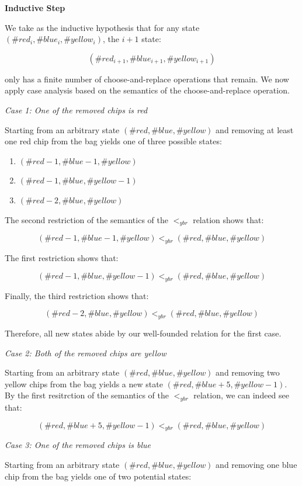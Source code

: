 \documentclass{article}
\begin{document}
\textbf{Inductive Step}

We take as the inductive hypothesis that for any state $(\#red_i, \#blue_i, \#yellow_i)$, the $i + 1$ state:

$$(\#red_{i + 1}, \#blue_{i + 1}, \#yellow_{i + 1})$$

only has a finite number of choose-and-replace operations that remain. We now apply case analysis based on the semantics of the choose-and-replace operation.

\emph{Case 1: One of the removed chips is red}

Starting from an arbitrary state $(\#red, \#blue, \#yellow)$ and removing at least one red chip from the bag yields one of three possible states:

\begin{enumerate}
  \item $(\#red - 1, \#blue - 1, \#yellow)$
  \item $(\#red - 1, \#blue, \#yellow - 1)$
  \item $(\#red - 2, \#blue, \#yellow)$
\end{enumerate}

The second restriction of the semantics of the $<_{ybr}$ relation shows that:

$$
(\#red - 1, \#blue - 1, \#yellow) <_{ybr} (\#red, \#blue, \#yellow)
$$

The first restriction shows that:

$$
(\#red - 1, \#blue, \#yellow - 1) <_{ybr} (\#red, \#blue, \#yellow)
$$

Finally, the third restriction shows that:

$$
(\#red - 2, \#blue, \#yellow) <_{ybr} (\#red, \#blue, \#yellow)
$$

Therefore, all new states abide by our well-founded relation for the first case.

\emph{Case 2: Both of the removed chips are yellow}

Starting from an arbitrary state $(\#red, \#blue, \#yellow)$ and removing two yellow chips from the bag yields a new state $(\#red, \#blue + 5, \#yellow - 1)$. By the first resitrction of the semantics of the $<_{ybr}$ relation, we can indeed see that:

$$
(\#red, \#blue + 5, \#yellow - 1) <_{ybr} (\#red, \#blue, \#yellow)
$$

\emph{Case 3: One of the removed chips is blue}

Starting from an arbitrary state $(\#red, \#blue, \#yellow)$ and removing one blue chip from the bag yields one of two potential states:
\end{document}
